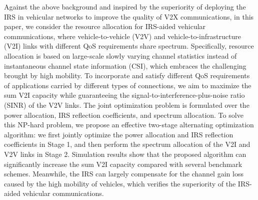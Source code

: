 \documentclass[journal]{IEEEtran}
\begin{document}
Against the above background and inspired by the superiority of deploying the IRS in vehicular networks to improve the quality of V2X communications, in this paper, we consider the resource allocation for IRS-aided vehicular communications, where vehicle-to-vehicle (V2V) and vehicle-to-infrastructure (V2I) links with different QoS requirements share spectrum. Specifically, resource allocation is based on large-scale slowly varying channel statistics instead of instantaneous channel state information (CSI), which embraces the challenging brought by high mobility. To incorporate and satisfy different QoS requirements of applications carried by different types of connections, we aim to maximize the sum V2I capacity while guaranteeing the signal-to-interference-plus-noise ratio (SINR) of the V2V links. The joint optimization problem is formulated over the power allocation, IRS reflection coefficients, and spectrum allocation. To solve this NP-hard problem, we propose an effective two-stage alternating optimization algorithm: we first jointly optimize the power allocation and IRS reflection coefficients in Stage 1, and then perform the spectrum allocation of the V2I and V2V links in Stage 2. Simulation results show that the proposed algorithm can significantly increase the sum V2I capacity compared with several benchmark schemes. Meanwhile, the IRS can largely compensate for the channel gain loss caused by the high mobility of vehicles, which verifies the superiority of the IRS-aided vehicular communications.

\end{document}
